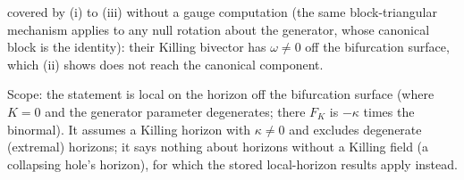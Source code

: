 covered by (i) to (iii) without a gauge computation (the same block-triangular mechanism applies to any null rotation about the generator, whose canonical block is the identity): their Killing bivector has $\omega \ne 0$ off the bifurcation surface, which (ii) shows does not reach the canonical component.

Scope: the statement is local on the horizon off the bifurcation surface (where $K = 0$ and the generator parameter degenerates; there $F_{K}$ is $-\kappa$ times the binormal). It assumes a Killing horizon with $\kappa \ne 0$ and excludes degenerate (extremal) horizons; it says nothing about horizons without a Killing field (a collapsing hole's horizon), for which the stored local-horizon results apply instead.
